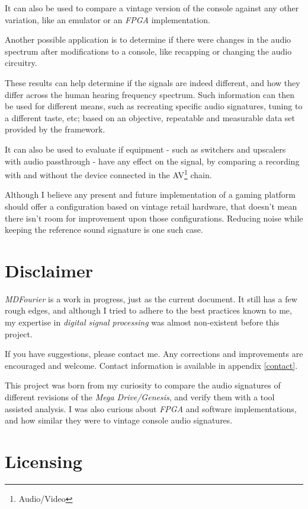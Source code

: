 \documentclass[10pt,a4paper]{report}
\begin{document}
It can also be used to compare a vintage version of the console against any other variation, like an emulator or an \textit{FPGA} implementation.

Another possible application is to determine if there were changes in the audio spectrum after modifications to a console, like recapping or changing the audio circuitry.

These results can help determine if the signals are indeed different, and how they differ across the human hearing frequency spectrum. Such information can then be used for different means, such as recreating specific audio signatures, tuning to a different taste, etc; based on an objective, repeatable and measurable data set provided by the framework.

It can also be used to evaluate if equipment - such as switchers and upscalers with audio passthrough - have any effect on the signal, by comparing a recording with and without the device connected in the AV\footnote{Audio/Video} chain.

Although I believe any present and future implementation of a gaming platform should offer a configuration based on vintage retail hardware, that doesn't mean there isn't room for improvement upon those configurations. Reducing noise while keeping the reference sound signature is one such case.

\newpage
\section{Disclaimer}

\textit{MDFourier} is a work in progress, just as the current document. It still has a few rough edges, and although I tried to adhere to the best practices known to me, my expertise in \textit{digital signal processing} was almost non-existent before this project. 

If you have suggestions, please contact me. Any corrections and improvements are encouraged and welcome. Contact information is available in appendix \ref{contact}.

This project was born from my curiosity to compare the audio signatures of different revisions of the  \textit{Mega Drive/Genesis}, and verify them with a tool assisted analysis. I was also curious about \textit{FPGA} and software implementations, and how similar they were to vintage console audio signatures.

\section{Licensing}
\end{document}
